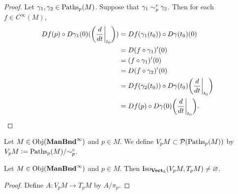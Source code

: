 \documentclass{book}
\begin{document}
	\begin{proof}
		Let $\gamma_1, \gamma_2 \in \text{Paths}_p(M)$. Suppose that $\gamma_1 \sim_p^v \gamma_2$. Then for each $f \in C^{\infty}(M)$, 
		\begin{align*}
			Df(p) \circ D \gamma_1(0) (\bigg(\frac{d}{dt}\bigg|_{t_0}\bigg))
			& = Df(\gamma_1(t_0)) \circ D \gamma(t_0) (0) \\
			& = D(f \circ \gamma_1)'(0) \\
			& = (f \circ \gamma_1)'(0) \\
			& = D(f \circ \gamma_2)'(0) \\
			& = Df(\gamma_2(t_0)) \circ D \gamma(t_0)  \bigg(\frac{d}{dt}\bigg|_{t_0}\bigg) \\
			& = Df(p) \circ D \gamma(0) \bigg(\frac{d}{dt}\bigg|_{t_0}\bigg).
		\end{align*}
	\end{proof}
	
	\begin{defn}
		Let $M \in \operatorname{Obj}(\operatorname*{\text{\textbf{ManBnd}}^{\infty}})$ and $p \in M$. We define $V_pM \subset \mathcal{P}(\text{Paths}_p(M))$ by $V_pM \vcentcolon= \text{Paths}_p(M) / {\sim_p^v}$.
	\end{defn}

	\begin{ex}
		Let $M \in \operatorname{Obj}(\operatorname*{\text{\textbf{ManBnd}}^{\infty}})$ and $p \in M$. Then $\operatorname{Iso}_{\operatorname*{\text{\textbf{Vect}}_{\mathbb{R}}}}(V_pM, T_pM) \neq \varnothing$. 
	\end{ex}
	
	\begin{proof}
		Define $A: V_pM \rightarrow T_pM$ by $A/\pi_p$. 
	\end{proof}
	
	
	
	
	
	
	
	
	
	
	
	
	
	
	
	
	
	
	
	
	
	
	
	
	
	
	
	
	
	
	
	
	
	
	
	
	
	
	
	
	
	
	
	
	
\end{document}
